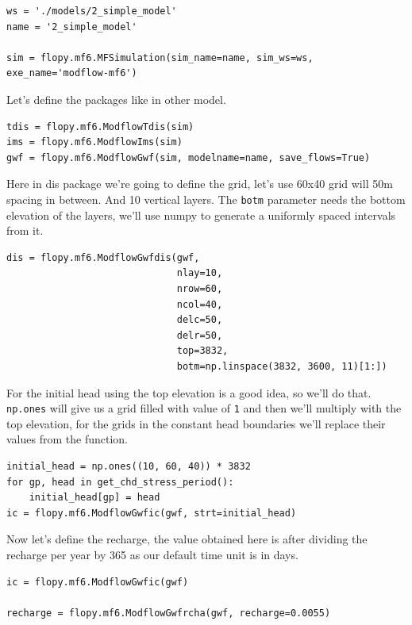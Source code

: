 \documentclass[titlepage,12pt]{unisubmission}
\begin{document}
\begin{verbatim}
ws = './models/2_simple_model'
name = '2_simple_model'

sim = flopy.mf6.MFSimulation(sim_name=name, sim_ws=ws, exe_name='modflow-mf6')
\end{verbatim}

Let's define the packages like in other model.

\begin{verbatim}
tdis = flopy.mf6.ModflowTdis(sim)
ims = flopy.mf6.ModflowIms(sim)
gwf = flopy.mf6.ModflowGwf(sim, modelname=name, save_flows=True)
\end{verbatim}

Here in dis package we're going to define the grid, let's use 60x40 grid will 50m spacing in between. And 10 vertical layers. The \texttt{botm} parameter needs the bottom elevation of the layers, we'll use numpy to generate a uniformly spaced intervals from it.

\begin{verbatim}
dis = flopy.mf6.ModflowGwfdis(gwf,
                              nlay=10,
                              nrow=60,
                              ncol=40,
                              delc=50,
                              delr=50,
                              top=3832,
                              botm=np.linspace(3832, 3600, 11)[1:])
\end{verbatim}

For the initial head using the top elevation is a good idea, so we'll do that. \texttt{np.ones} will give us a grid filled with value of \texttt{1} and then we'll multiply with the top elevation, for the grids in the constant head boundaries we'll replace their values from the function.

\begin{verbatim}
initial_head = np.ones((10, 60, 40)) * 3832
for gp, head in get_chd_stress_period():
    initial_head[gp] = head
ic = flopy.mf6.ModflowGwfic(gwf, strt=initial_head)
\end{verbatim}

Now let's define the recharge, the value obtained here is after dividing the recharge per year by 365 as our default time unit is in days.

\begin{verbatim}
ic = flopy.mf6.ModflowGwfic(gwf)

recharge = flopy.mf6.ModflowGwfrcha(gwf, recharge=0.0055)
\end{verbatim}
\end{document}
